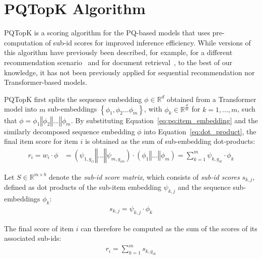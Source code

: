 \documentclass[sigconf,natbib=true, review=true]{acmart} %
\newcommand{\rsasha}[1]{\textcolor[HTML]{FF0000}{#1}}
\begin{document}
\section{PQTopK Algorithm} \label{sec:pq_topk}
\rsasha{PQTopK is a scoring algorithm for the PQ-based models \rsasha{that uses pre-computation of sub-id scores for improved inference efficiency}. While versions of this algorithm have previously been described, for example, for a different recommendation scenario~\cite{lianLightRecMemorySearchEfficient2020} and for document retrieval~\cite{zhanJointlyOptimizingQuery2021}, to the best of our knowledge, it has not been previously applied for sequential recommendation nor Transformer-based models.}

 PQTopK first splits the sequence embedding $\phi \in \mathbb{R}^{d}$ \rsasha{obtained from a Transformer model} into $m$ sub-embeddings $\left\{\phi_1, \phi_2 ... \phi_m\right\}$, with $\phi_{k} \in \mathbb{R}^{\frac{d}{m}}$ for $k=1, \ldots,m$, such that $\phi = \phi_1  \mathbin\Vert \phi_2  \mathbin\Vert ... \mathbin\Vert  \phi_m$.
By substituting Equation~\eqref{eq:pq:item_embedding} and the similarly decomposed sequence embedding $\phi$ into Equation~\eqref{eq:dot_product}, the final item score for item $i$ is obtained as the sum of sub-embedding dot-products: 
\begin{align}
   r_i = w_i \cdot \phi &= (\psi_{1,g_{i1}} \mathbin\Vert ... \mathbin\Vert  \psi_{m,g_{im}}) \cdot (\phi_1  \mathbin\Vert ... \mathbin\Vert  \phi_m) = \sum_{k=1}^m \psi_{k,g_{ik}} \cdot \phi_k \nonumber
\end{align}

Let $S \in \mathbb{R}^{m \times b}$ denote the \emph{sub-id score matrix}, which consists of \emph{sub-id scores} $s_{k,j}$, defined as dot products of the sub-item embedding $\psi_{k,j}$ and the sequence sub-embeddings $\phi_k$:
\begin{align}
s_{k,j} = \psi_{k,j} \cdot \phi_k\label{eq:sub_item_scores}
\end{align}

The final score of item $i$ can therefore be computed as the sum of the scores of its associated sub-ids:
\begin{align}
   r_{i} = \sum_{k=1}^m s_{k,g_{ik}} \label{eq:sum_sub_scores}
\end{align}
\end{document}
